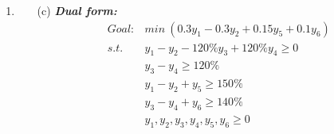 \documentclass[12pt,a4paper]{article}
\makeatletter
\newtheorem*{solution}{Solution}
\theoremstyle{definition}
\renewenvironment{solution}[1][Solution] {\par\pushQED{\qed}\normalfont\topsep6\p@\@plus6\p@\relax\trivlist\item[\hskip\labelsep\bfseries#1\@addpunct{.}]\ignorespaces}{\popQED\endtrivlist\@endpefalse} \makeatother
\makeatother
\begin{document}
\begin{enumerate}
\begin{solution}
\begin{enumerate}
        \item [(c)]
        \textbf{\textit{Dual form:}}
        \begin{equation}\nonumber
            \begin{split}
             Goal: & min\ (0.3y_1-0.3y_2+0.15y_5+0.1y_6) \\ 
             s.t.\  & y_1-y_2-120\%y_3+120\%y_4 \geq 0\\
                    & y_3-y_4\geq 120\% \\
                    & y_1-y_2+y_5\geq 150\% \\
                    & y_3-y_4+y_6\geq 140\% \\
                    & y_1,y_2,y_3,y_4,y_5,y_6 \geq 0
            \end{split}
        \end{equation}
        

\end{enumerate}
\end{solution}
\end{enumerate}
\end{document}
